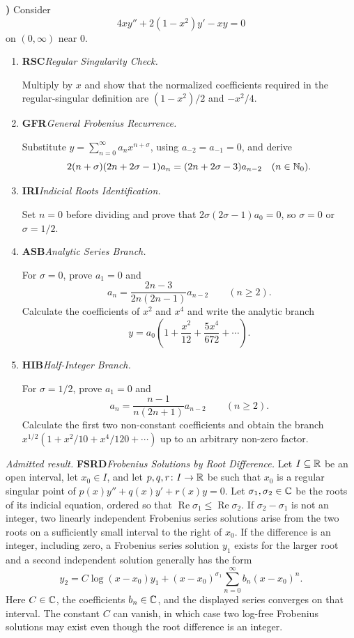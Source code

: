 \documentclass[10pt,a4paper]{article}
\newcounter{examquestion}
\newcommand{\examquestion}[1]{%
  \Needspace{5\baselineskip}%
  \refstepcounter{examquestion}%
  \par\addvspace{0.8\baselineskip}%
  \noindent\textbf{\theexamquestion)}\enspace #1\par
}
\newenvironment{subquestions}
  {\begin{enumerate}[label=\alph*),leftmargin=2.1em]}
  {\end{enumerate}}
\newcommand{\nameditem}[2]{%
  \textbf{\textsf{#1}}\enspace\emph{#2.}\enspace
}
\newcommand{\admitted}[3]{%
  \par\smallskip\noindent\emph{Admitted result.}\enspace
  \nameditem{#1}{#2}#3\par
}
\begin{document}
\examquestion{\label{q:frobenius-half-index}
Consider
\[
  4xy''+2(1-x^2)y'-xy=0
\]
on $(0,\infty)$ near $0$.
\begin{subquestions}
  \item \nameditem{RSC}{Regular Singularity Check}
  Multiply by $x$ and show that the normalized coefficients required in the
  regular-singular definition are $(1-x^2)/2$ and $-x^2/4$.

  \item \nameditem{GFR}{General Frobenius Recurrence}
  Substitute $y=\sum_{n=0}^{\infty}a_nx^{n+\sigma}$, using
  $a_{-2}=a_{-1}=0$, and derive
  \[
  2(n+\sigma)(2n+2\sigma-1)a_n
   =(2n+2\sigma-3)a_{n-2}
  \quad(n\in\mathbb{N}_0).
  \]

  \item \nameditem{IRI}{Indicial Roots Identification}
  Set $n=0$ before dividing and prove that
  $2\sigma(2\sigma-1)a_0=0$, so $\sigma=0$ or $\sigma=1/2$.

  \item \nameditem{ASB}{Analytic Series Branch}
  For $\sigma=0$, prove $a_1=0$ and
  \[
    a_n=\frac{2n-3}{2n(2n-1)}a_{n-2}\qquad(n\geq2).
  \]
  Calculate the coefficients of $x^2$ and $x^4$ and write the analytic
  branch
  \[
    y=a_0\left(1+\frac{x^2}{12}+\frac{5x^4}{672}+\cdots\right).
  \]

  \item \nameditem{HIB}{Half-Integer Branch}
  For $\sigma=1/2$, prove $a_1=0$ and
  \[
    a_n=\frac{n-1}{n(2n+1)}a_{n-2}\qquad(n\geq2).
  \]
  Calculate the first two non-constant coefficients and obtain the branch
  $x^{1/2}(1+x^2/10+x^4/120+\cdots)$ up to an arbitrary non-zero factor.
\end{subquestions}}

\admitted{FSRD}{Frobenius Solutions by Root Difference}{Let
$I\subseteq\mathbb{R}$ be an open interval, let $x_0\in I$, and let
$p,q,r\colon I\to\mathbb{R}$ be such that $x_0$ is a regular singular point of
$p(x)y''+q(x)y'+r(x)y=0$.  Let $\sigma_1,\sigma_2\in\mathbb{C}$ be the roots of its
indicial equation, ordered so that
$\operatorname{Re}\sigma_1\leq\operatorname{Re}\sigma_2$.  If
$\sigma_2-\sigma_1$ is not an integer, two linearly independent Frobenius
series solutions arise from the two roots on a sufficiently small interval
to the right of $x_0$.  If the difference is an integer, including zero, a
Frobenius series solution $y_1$ exists for the larger root and a second
independent solution generally has the form
\[
 y_2=C\log(x-x_0)y_1
 +(x-x_0)^{\sigma_1}\sum_{n=0}^{\infty}b_n(x-x_0)^n.
\]
Here $C\in\mathbb{C}$, the coefficients $b_n\in\mathbb{C}$, and the displayed series
converges on that interval.  The constant $C$ can vanish, in which case two
log-free Frobenius solutions may exist even though the root difference is an
integer.}
\end{document}
